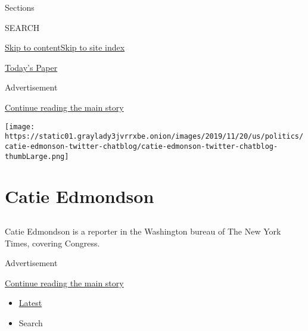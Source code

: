 Sections

SEARCH

\protect\hyperlink{site-content}{Skip to
content}\protect\hyperlink{site-index}{Skip to site index}

\href{https://myaccount.nytimes3xbfgragh.onion/auth/login?response_type=cookie\&client_id=vi}{}

\href{https://www.nytimes3xbfgragh.onion/section/todayspaper}{Today's
Paper}

Advertisement

\protect\hyperlink{after-top}{Continue reading the main story}

\texttt{[image: https://static01.graylady3jvrrxbe.onion/images/2019/11/20/us/politics/catie-edmonson-twitter-chatblog/catie-edmonson-twitter-chatblog-thumbLarge.png]}

\hypertarget{catie-edmondson}{%
\section{Catie Edmondson}\label{catie-edmondson}}

\subsection{}

Catie Edmondson is a reporter in the Washington bureau of The New York
Times, covering Congress.

Advertisement

\protect\hyperlink{after-mid1}{Continue reading the main story}

\begin{itemize}
\tightlist
\item
  \protect\hyperlink{stream-panel}{Latest}
\item
  Search
\end{itemize}

